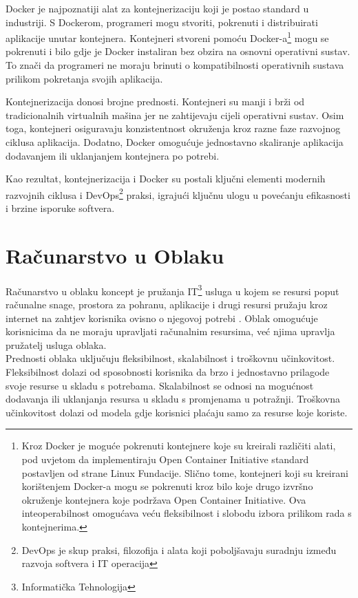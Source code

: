 \documentclass[times, utf8, diplomski]{fer}
\begin{document}
Docker je najpoznatiji alat za kontejnerizaciju koji je postao standard u industriji. S Dockerom, programeri mogu stvoriti, pokrenuti i distribuirati aplikacije unutar kontejnera. Kontejneri stvoreni pomoću Docker-a\footnote{Kroz Docker je moguće pokrenuti kontejnere koje su kreirali različiti alati, pod uvjetom da implementiraju Open Container Initiative standard postavljen od strane Linux Fundacije. Slično tome, kontejneri koji su kreirani korištenjem Docker-a mogu se pokrenuti kroz bilo koje drugo izvršno okruženje kontejnera koje podržava Open Container Initiative. Ova inteoperabilnost omogućava veću fleksibilnost i slobodu izbora prilikom rada s kontejnerima.} mogu se pokrenuti i bilo gdje je Docker instaliran bez obzira na osnovni operativni sustav. To znači da programeri ne moraju brinuti o kompatibilnosti operativnih sustava prilikom pokretanja svojih aplikacija.

Kontejnerizacija donosi brojne prednosti. Kontejneri su manji i brži od tradicionalnih virtualnih mašina jer ne zahtijevaju cijeli operativni sustav. Osim toga, kontejneri osiguravaju konzistentnost okruženja kroz razne faze razvojnog ciklusa aplikacija. Dodatno, Docker omogućuje jednostavno skaliranje aplikacija dodavanjem ili uklanjanjem kontejnera po potrebi.

Kao rezultat, kontejnerizacija i Docker su postali ključni elementi modernih razvojnih ciklusa i DevOps\footnote{DevOps je skup praksi, filozofija i alata koji poboljšavaju suradnju između razvoja softvera  i IT operacija } praksi, igrajući ključnu ulogu u povećanju efikasnosti i brzine isporuke softvera.

\section{Računarstvo u Oblaku}

Računarstvo u oblaku  koncept je pružanja IT\footnote{Informatička Tehnologija } usluga u kojem se resursi poput računalne snage, prostora za pohranu, aplikacije i drugi resursi pružaju kroz internet na zahtjev korisnika ovisno o njegovoj potrebi \citep{zarko_raspodijeljeni_2013}. Oblak omogućuje korisnicima da ne moraju upravljati računalnim resursima, već njima upravlja pružatelj usluga oblaka. \\

Prednosti oblaka uključuju fleksibilnost, skalabilnost i troškovnu učinkovitost. Fleksibilnost dolazi od sposobnosti korisnika da brzo i jednostavno prilagode svoje resurse u skladu s potrebama. Skalabilnost se odnosi na mogućnost dodavanja ili uklanjanja resursa u skladu s promjenama u potražnji. Troškovna učinkovitost dolazi od modela gdje korisnici plaćaju samo za resurse koje koriste.
\end{document}

